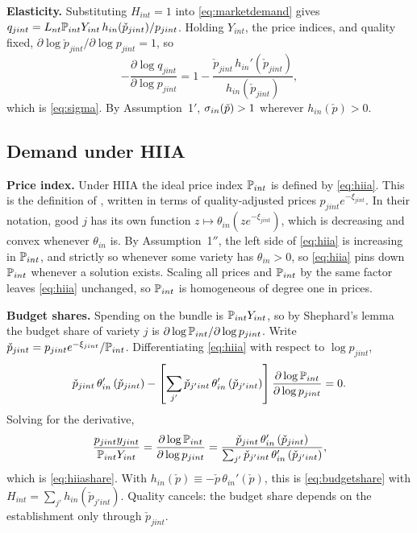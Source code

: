 \textbf{Elasticity.}
Substituting $H_{int} = 1$ into \eqref{eq:marketdemand} gives $q_{jint} = L_{nt} \P_{int} Y_{int} \, h_{in}(\check{p}_{jint})/p_{jint}$.
Holding $Y_{int}$, the price indices, and quality fixed, $\partial \log \check{p}_{jint}/\partial \log p_{jint} = 1$, so
\begin{equation*}
	-\frac{\partial \log q_{jint}}{\partial \log p_{jint}} = 1 - \frac{\check{p}_{jint}\, h_{in}'(\check{p}_{jint})}{h_{in}(\check{p}_{jint})},
\end{equation*}
which is \eqref{eq:sigma}.
By Assumption~1$'$, $\s_{in}(\check{p}) > 1$ wherever $h_{in}(\check{p}) > 0$.

\subsection{Demand under HIIA}\label{sec:app-hiia}

\textbf{Price index.}
Under HIIA the ideal price index $\P_{int}$ is defined by \eqref{eq:hiia}.
This is the definition of \textcite{Matsuyama&Ushev17}, written in terms of quality-adjusted prices $p_{jint} e^{-\xi_{jint}}$.
In their notation, good $j$ has its own function $z \mapsto \theta_{in}(z e^{-\xi_{jint}})$, which is decreasing and convex whenever $\theta_{in}$ is.
By Assumption~1$''$, the left side of \eqref{eq:hiia} is increasing in $\P_{int}$, and strictly so whenever some variety has $\theta_{in} > 0$, so \eqref{eq:hiia} pins down $\P_{int}$ whenever a solution exists.
Scaling all prices and $\P_{int}$ by the same factor leaves \eqref{eq:hiia} unchanged, so $\P_{int}$ is homogeneous of degree one in prices.

\textbf{Budget shares.}
Spending on the bundle is $\P_{int} Y_{int}$, so by Shephard's lemma the budget share of variety $j$ is $\partial \log \P_{int}/\partial \log p_{jint}$.
Write $\check{p}_{jint} = p_{jint} e^{-\xi_{jint}}/\P_{int}$.
Differentiating \eqref{eq:hiia} with respect to $\log p_{jint}$,
\begin{equation*}
	\check{p}_{jint}\,\theta_{in}'\left(\check{p}_{jint}\right) - \left[\sum_{j'} \check{p}_{j'int}\,\theta_{in}'\left(\check{p}_{j'int}\right)\right] \frac{\partial \log \P_{int}}{\partial \log p_{jint}} = 0.
\end{equation*}
Solving for the derivative,
\begin{equation*}
	\frac{p_{jint} y_{jint}}{\P_{int} Y_{int}} = \frac{\partial \log \P_{int}}{\partial \log p_{jint}} = \frac{\check{p}_{jint}\,\theta_{in}'\left(\check{p}_{jint}\right)}{\sum_{j'} \check{p}_{j'int}\,\theta_{in}'\left(\check{p}_{j'int}\right)},
\end{equation*}
which is \eqref{eq:hiiashare}.
With $h_{in}(\check{p}) \equiv -\check{p}\,\theta_{in}'(\check{p})$, this is \eqref{eq:budgetshare} with $H_{int} = \sum_{j'} h_{in}(\check{p}_{j'int})$.
Quality cancels: the budget share depends on the establishment only through $\check{p}_{jint}$.

